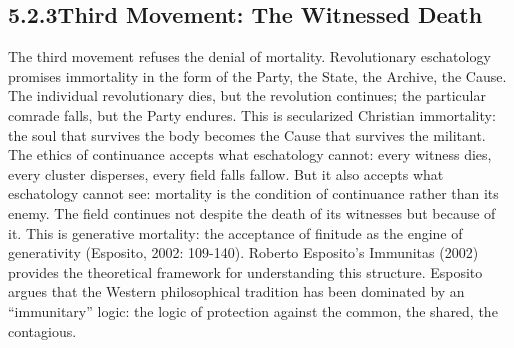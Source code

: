 \subsection{5.2.3\quad Third Movement: The Witnessed Death}

The third movement refuses the denial of mortality. Revolutionary eschatology promises immortality in the form of the Party, the State, the Archive, the Cause. The individual revolutionary dies, but the revolution continues; the particular comrade falls, but the Party endures. This is secularized Christian immortality: the soul that survives the body becomes the Cause that survives the militant. The ethics of continuance accepts what eschatology cannot: every witness dies, every cluster disperses, every field falls fallow. But it also accepts what eschatology cannot see: mortality is the condition of continuance rather than its enemy. The field continues not despite the death of its witnesses but because of it. This is generative mortality: the acceptance of finitude as the engine of generativity (Esposito, 2002: 109-140). Roberto Esposito’s Immunitas (2002) provides the theoretical framework for understanding this structure. Esposito argues that the Western philosophical tradition has been dominated by an “immunitary” logic: the logic of protection against the common, the shared, the contagious.

